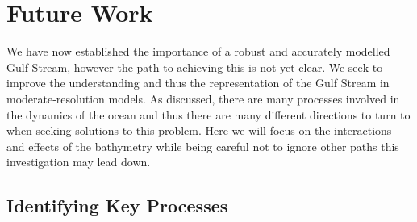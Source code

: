 \documentclass[..\report.tex]{subfiles}
\begin{document}
\section{Future Work}
\label{SEC:FutureWork}

We have now established the importance of a robust and accurately modelled Gulf Stream, however the path to achieving this is not yet clear.
We seek to improve the understanding and thus the representation of the Gulf Stream in moderate-resolution models.
As discussed, there are many processes involved in the dynamics of the ocean and thus there are many different directions to turn to when seeking solutions to this problem. Here we will focus on the interactions and effects of the bathymetry while being careful not to ignore other paths this investigation may lead down. 

\subsection{Identifying Key Processes}
\label{SSEC:IdentifyingKeyProcesses}


\end{document}
